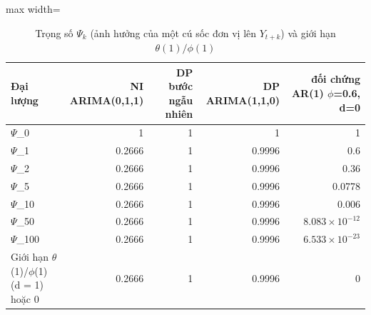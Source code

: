 \begin{table}[H]
\centering\small
\caption{Trọng số $\Psi_k$ (ảnh hưởng của một cú sốc đơn vị lên $Y_{t+k}$) và giới hạn $\theta(1)/\phi(1)$}\label{tab:tab_b12_06_psi_weights}
\begin{adjustbox}{max width=\linewidth}
\begin{tabular}{lrrrr}
\toprule
Đại lượng & NI ARIMA(0,1,1) & DP bước ngẫu nhiên & DP ARIMA(1,1,0) & đối chứng AR(1) $\phi$=0.6, d=0 \\
\midrule
$\Psi$\_0 & 1 & 1 & 1 & 1 \\
$\Psi$\_1 & 0.2666 & 1 & 0.9996 & 0.6 \\
$\Psi$\_2 & 0.2666 & 1 & 0.9996 & 0.36 \\
$\Psi$\_5 & 0.2666 & 1 & 0.9996 & 0.0778 \\
$\Psi$\_10 & 0.2666 & 1 & 0.9996 & 0.006 \\
$\Psi$\_50 & 0.2666 & 1 & 0.9996 & $8.083\times10^{-12}$ \\
$\Psi$\_100 & 0.2666 & 1 & 0.9996 & $6.533\times10^{-23}$ \\
Giới hạn $\theta$(1)/$\phi$(1) (d = 1) hoặc 0 & 0.2666 & 1 & 0.9996 & 0 \\
\bottomrule
\end{tabular}
\end{adjustbox}
\end{table}
